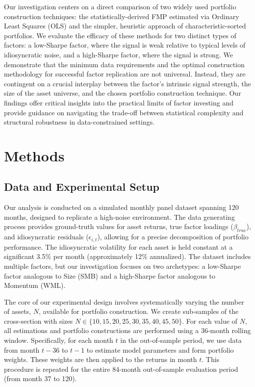 \documentclass[]{article}
\begin{document}
Our investigation centers on a direct comparison of two widely used portfolio construction techniques: the statistically-derived FMP estimated via Ordinary Least Squares (OLS) and the simpler, heuristic approach of characteristic-sorted portfolios. We evaluate the efficacy of these methods for two distinct types of factors: a low-Sharpe factor, where the signal is weak relative to typical levels of idiosyncratic noise, and a high-Sharpe factor, where the signal is strong. We demonstrate that the minimum data requirements and the optimal construction methodology for successful factor replication are not universal. Instead, they are contingent on a crucial interplay between the factor's intrinsic signal strength, the size of the asset universe, and the chosen portfolio construction technique. Our findings offer critical insights into the practical limits of factor investing and provide guidance on navigating the trade-off between statistical complexity and structural robustness in data-constrained settings.

\section{Methods}
\label{sec:methods}
\subsection{Data and Experimental Setup}
Our analysis is conducted on a simulated monthly panel dataset spanning 120 months, designed to replicate a high-noise environment. The data generating process provides ground-truth values for asset returns, true factor loadings ($\beta_{true}$), and idiosyncratic residuals ($\epsilon_{i,t}$), allowing for a precise decomposition of portfolio performance. The idiosyncratic volatility for each asset is held constant at a significant 3.5\% per month (approximately 12\% annualized). The dataset includes multiple factors, but our investigation focuses on two archetypes: a low-Sharpe factor analogous to Size (SMB) and a high-Sharpe factor analogous to Momentum (WML).

The core of our experimental design involves systematically varying the number of assets, $N$, available for portfolio construction. We create sub-samples of the cross-section with sizes $N \in \{10, 15, 20, 25, 30, 35, 40, 45, 50\}$. For each value of $N$, all estimations and portfolio constructions are performed using a 36-month rolling window. Specifically, for each month $t$ in the out-of-sample period, we use data from month $t-36$ to $t-1$ to estimate model parameters and form portfolio weights. These weights are then applied to the returns in month $t$. This procedure is repeated for the entire 84-month out-of-sample evaluation period (from month 37 to 120).
\end{document}

